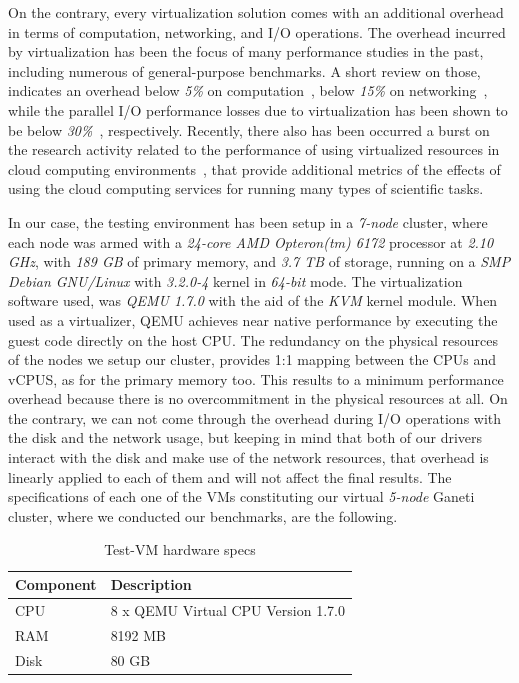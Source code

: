 On the contrary, every virtualization solution comes with an additional overhead
in terms of computation, networking, and I/O operations. The overhead incurred
by virtualization has been the focus of many performance studies in the past,
including numerous of general-purpose benchmarks. A short review on those,
indicates an overhead below \emph{5\%} on computation~\cite{xen_art}, below
\emph{15\%} on networking~\cite{xen_art, diagnosing}, while the parallel I/O
performance losses  due to virtualization has been shown to be below
\emph{30\%}~\cite{xen_hpc}, respectively. Recently, there also has been occurred
a burst on the research activity related to the performance of using virtualized
resources in cloud computing environments~\cite{montage, Iosup_anearly,
parallel}, that provide additional metrics of the effects of using the cloud
computing services for running many types of scientific tasks.

In our case, the testing environment has been setup in a \emph{7-node}
cluster, where each node was armed with a \emph{24-core AMD Opteron(tm) 6172}
processor at \emph{2.10 GHz}, with \emph{189 GB} of primary memory, and
\emph{3.7 TB} of storage, running on a \emph{SMP Debian GNU/Linux} with
\emph{3.2.0-4} kernel in \emph{64-bit} mode. The virtualization software used,
was \emph{QEMU 1.7.0} with the aid of the \emph{KVM} kernel module. When used as
a virtualizer, QEMU achieves near native performance by executing the guest code
directly on the host CPU. The redundancy on the physical resources of the
nodes we setup our cluster, provides 1:1 mapping between the CPUs and vCPUS, as
for the primary memory too. This results to a
minimum performance overhead because there is no overcommitment in the physical
resources at all. On the contrary, we can not come through the overhead during
I/O operations with the disk and the network usage, but keeping in mind that both
of our drivers interact with the disk and make use of the network resources,
that overhead is linearly applied to each of them and will not affect the final
results. The specifications of each one of the VMs constituting our virtual
\emph{5-node} Ganeti cluster, where we conducted our benchmarks, are the
following.

\begin{table}[htbp]
  \centering
  \begin{tabular}{ | l | l | }
    \hline
    Component & Description \\ \hline \hline
    CPU & 8 x QEMU Virtual CPU Version 1.7.0 \\
    \hline
    RAΜ & 8192 MB  \\
    \hline
    Disk & 80 GB \\
    \hline
  \end{tabular}
  \caption{Test-VM hardware specs}
  \label{tab:hw-specs}
\end{table}

